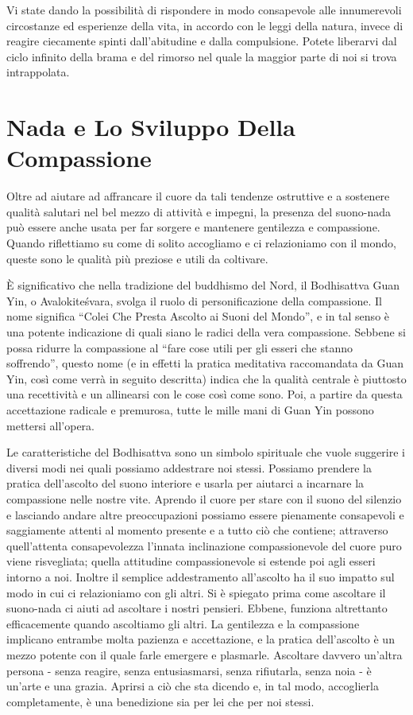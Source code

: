 Vi state dando la possibilità di rispondere in modo consapevole alle
innumerevoli circostanze ed esperienze della vita, in accordo con le
leggi della natura, invece di reagire ciecamente spinti dall'abitudine e
dalla compulsione. Potete liberarvi dal ciclo infinito della brama e del
rimorso nel quale la maggior parte di noi si trova intrappolata.

\section{Nada e Lo Sviluppo Della Compassione}

Oltre ad aiutare ad affrancare il cuore da tali tendenze ostruttive e a
sostenere qualità salutari nel bel mezzo di attività e impegni, la
presenza del suono-nada può essere anche usata per far sorgere e
mantenere gentilezza e compassione. Quando riflettiamo su come di solito
accogliamo e ci relazioniamo con il mondo, queste sono le qualità più
preziose e utili da coltivare.

È significativo che nella tradizione del buddhismo del Nord, il
Bodhisattva Guan Yin, o Avalokiteśvara, svolga il ruolo di
personificazione della compassione. Il nome significa ``Colei Che Presta
Ascolto ai Suoni del Mondo'', e in tal senso è una potente indicazione
di quali siano le radici della vera compassione. Sebbene si possa
ridurre la compassione al ``fare cose utili per gli esseri che stanno
soffrendo'', questo nome (e in effetti la pratica meditativa
raccomandata da Guan Yin, così come verrà in seguito descritta) indica
che la qualità centrale è piuttosto una recettività e un allinearsi con
le cose così come sono. Poi, a partire da questa accettazione radicale e
premurosa, tutte le mille mani di Guan Yin possono mettersi all'opera.

Le caratteristiche del Bodhisattva sono un simbolo spirituale che vuole
suggerire i diversi modi nei quali possiamo addestrare noi stessi.
Possiamo prendere la pratica dell'ascolto del suono interiore e usarla
per aiutarci a incarnare la compassione nelle nostre vite. Aprendo il
cuore per stare con il suono del silenzio e lasciando andare altre
preoccupazioni possiamo essere pienamente consapevoli e saggiamente
attenti al momento presente e a tutto ciò che contiene; attraverso
quell'attenta consapevolezza l'innata inclinazione compassionevole del
cuore puro viene risvegliata; quella attitudine compassionevole si
estende poi agli esseri intorno a noi. Inoltre il semplice addestramento
all'ascolto ha il suo impatto sul modo in cui ci relazioniamo con gli
altri. Si è spiegato prima come ascoltare il suono-nada ci aiuti ad
ascoltare i nostri pensieri. Ebbene, funziona altrettanto efficacemente
quando ascoltiamo gli altri. La gentilezza e la compassione implicano
entrambe molta pazienza e accettazione, e la pratica dell'ascolto è un
mezzo potente con il quale farle emergere e plasmarle. Ascoltare davvero
un'altra persona - senza reagire, senza entusiasmarsi, senza rifiutarla,
senza noia - è un'arte e una grazia. Aprirsi a ciò che sta dicendo e, in
tal modo, accoglierla completamente, è una benedizione sia per lei che
per noi stessi.

